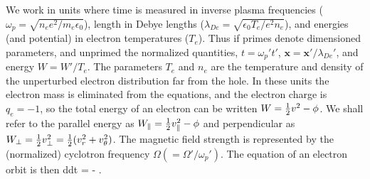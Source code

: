 \documentclass{agujournal2019}
\let\oldequation\equation
\let\oldendequation\endequation
\renewenvironment{equation}
  {\linenomathNonumbers\oldequation}
  {\oldendequation\endlinenomath}
\begin{document}
We work in units where time is measured in inverse plasma frequencies
($\omega_p=\sqrt{n_ee^2/m_e\epsilon_0}$), length in Debye lengths
($\lambda_{De}=\sqrt{\epsilon_0T_e/e^2n_e}$), and energies (and
potential) in electron temperatures ($T_e$). Thus if primes denote
dimensioned parameters, and unprimed the normalized quantities,
$t=\omega_p't'$, $\bm{x}=\bm{x}'/\lambda_{De}'$, and energy
$W=W'/T_e$. The parameters $T_e$ and $n_e$ are the temperature and
density of the unperturbed electron distribution far from the hole.
In these units the electron mass is eliminated from the equations, and
the electron charge is $q_e=-1$, so the total energy of an electron
can be written $W={1\over2}v^2-\phi$. We shall refer to the
parallel energy as $W_\parallel={1\over2}v_\parallel^2-\phi$ and
perpendicular as
$W_\perp = {1\over2}v_\perp^2={1\over2}(v_r^2+v_\theta^2)$. The
magnetic field strength is represented by the (normalized) cyclotron
frequency $\Omega(=\Omega'/\omega_p')$. The equation of an electron
orbit is then
\begin{equation}
  \label{eq:orbit}
  {d\over dt} = \bm\nabla \phi - \times\Omega{}.
\end{equation}
 
\end{document}

